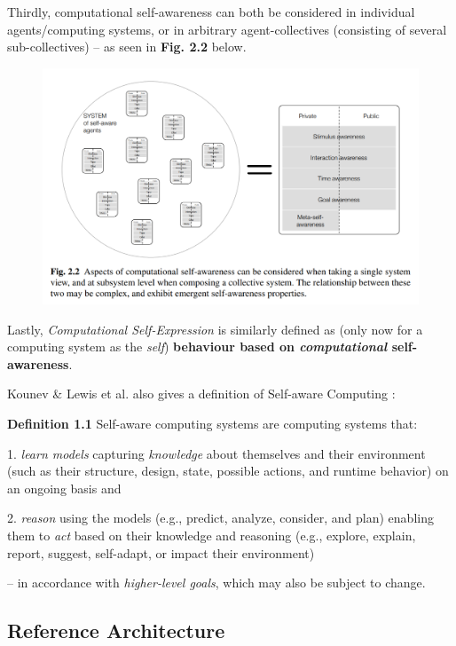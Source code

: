 \documentclass{article}
\begin{document}
\newpage
Thirdly, computational self-awareness can both be considered in individual agents/computing systems, or in arbitrary agent-collectives (consisting of several sub-collectives) -- as seen in \textbf{Fig. 2.2} below.

\begin{figure}[!htp]
\centering
\includegraphics[width=0.9\columnwidth]{Assets/pics/collective_self_awareness.PNG}
\end{figure}

Lastly, \textit{Computational Self-Expression} is similarly defined as  (only now for a computing system as the \textit{self}) \textbf{behaviour based on \textit{computational} self-awareness}.
\newline

Kounev \& Lewis et al. also gives a definition of Self-aware Computing \cite{sacs17_ch1}:

\textbf{Definition 1.1} Self-aware computing systems are computing systems that:

1. \textit{learn models} capturing \textit{knowledge} about themselves and their environment (such as their structure, design, state, possible actions, and runtime behavior) on an ongoing basis and

2. \textit{reason} using the models (e.g., predict, analyze, consider, and plan) enabling them to \textit{act} based on their knowledge and reasoning (e.g., explore, explain, report, suggest, self-adapt, or impact their environment)

-- in accordance with \textit{higher-level goals}, which may also be subject to change.

\subsection{Reference Architecture}
\end{document}
